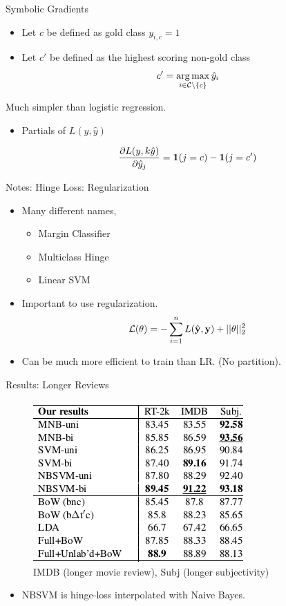\documentclass{beamer}
\begin{document}
\begin{frame}{Symbolic Gradients}

  \begin{itemize}
  \item   Let $c$ be defined as gold class $y_{i, c} = 1$  
  \item   Let $c'$ be defined as the highest scoring non-gold class 
    \[c' = \argmax_{i \in \mcC \setminus\{c\}} \hat{y}_i \] 
  \end{itemize}
  
  Much simpler than logistic regression.

  \begin{itemize}
  \item Partials of $L(y, \hat{y})$

  \[ \frac{\partial L(y,k \hat{y})}{\partial \hat{y}_j} = \mathbf{1}(j = c) - \mathbf{1}(j = c')  \]

   \end{itemize}
\end{frame}




\begin{frame}{Notes: Hinge Loss: Regularization}
  \begin{itemize}
  \item   Many different names,
  \begin{itemize}
  \item Margin Classifier
  \item Multiclass Hinge
  \item Linear SVM
  \end{itemize}

  \item Important to use regularization.  
  \[ \mathcal{L}(\theta) = - \sum_{i=1}^n L(\hat{\mathbf{y}}, \mathbf{y}) + ||\theta||^2_2\] 

  \item Can be much more efficient to train than LR. (No partition).

  \end{itemize}
\end{frame}
  

\begin{frame}{Results: Longer Reviews}
  \begin{figure}
    \centering
    \includegraphics{svm}
    \caption{IMDB (longer movie review), Subj (longer subjectivity)}
  \end{figure}

  \begin{itemize}
  \item NBSVM is hinge-loss interpolated with Naive Bayes.
  \end{itemize}
\end{frame}
\end{document}

